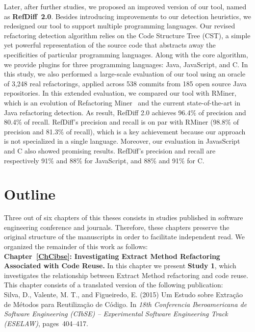 Later, after further studies, we proposed an improved version of our tool, named as \textbf{RefDiff~2.0}.
Besides introducing improvements to our detection heuristics, we redesigned our tool to support multiple programming languages. Our revised refactoring detection algorithm relies on the Code Structure Tree (CST), a simple yet powerful representation of the source code that abstracts away the specificities of particular programming languages.
Along with the core algorithm, we provide plugins for three programming languages: Java, JavaScript, and C.
In this study, we also performed a large-scale evaluation of our tool using an  oracle of 3,248 real refactorings, applied across 538 commits from 185 open source Java repositories.
In this extended evaluation, we compared our tool with RMiner, which is an evolution of Refactoring Miner~\citep{tsantalis2018rminer} and the current state-of-the-art in Java refactoring detection.
As result, RefDiff 2.0 achieves 96.4\% of precision and 80.4\% of recall.
RefDiff's precision and recall is on par with RMiner (98.8\% of precision and 81.3\% of recall), which is a key achievement because our approach is not specialized in a single language.
Moreover, our  evaluation  in  JavasScript  and  C  also showed promising results. RefDiff’s precision and recall are respectively 91\% and 88\% for JavaScript, and 88\% and 91\% for C.





\section{Outline}
\label{SecOutline}

Three out of six chapters of this theses consists in studies published in software engineering conference and journals.
Therefore, these chapters preserve the original structure of the manuscripts in order to facilitate independent read.
We organized the remainder of this work as follows:
\\[6pt]

\noindent\textbf{Chapter~\ref{ChCibse}: Investigating Extract Method Refactoring Associated with Code Reuse.} In this chapter we present \textbf{Study 1}, which investigates the relationship between Extract Method refactoring and code reuse. This chapter consists of a translated version of the following publication:
\\[6pt]
\noindent Silva, D., Valente, M. T., and Figueiredo, E. (2015) Um Estudo sobre Extração de Métodos para Reutilização de Código. In \emph{18th Conferencia Iberoamericana de Software Engineering (CIbSE) -- Experimental Software Engineering Track (ESELAW)}, pages~404--417.
\\[6pt]

